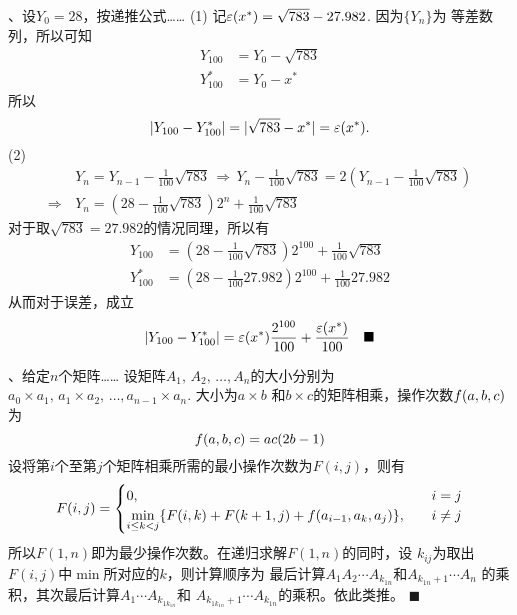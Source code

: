 \par{}、设$Y_0 = 28$，按递推公式……
\ans
  (1) 记$\varepsilon(x^*) = \sqrt{783} - 27.982$. 因为$\{Y_n\}$为
  等差数列，所以可知
  \[\begin{split}
    Y_{100} &= Y_0 - \sqrt{783} \\
    Y_{100}^* &= Y_0 - x^*
  \end{split}\]
  所以
  \[
    |Y_{100} - Y_{100}^*| = |\sqrt{783} - x^*| = \varepsilon(x^*).
  \]
  (2)
  \[\begin{split}
    &Y_n = Y_{n-1}-\frac{1}{100}\sqrt{783}
    \,\Rightarrow\,
    Y_n - \frac{1}{100}\sqrt{783} = 2\left(Y_{n-1} - \frac{1}{100}\sqrt{783}\right)\\
    \Rightarrow\, &
    Y_n = \left(28 - \frac{1}{100}\sqrt{783}\right)2^n
    + \frac{1}{100}\sqrt{783}
  \end{split}\]
  对于取$\sqrt{783} = 27.982$的情况同理，所以有
  \[\begin{split}
    Y_{100} &= \left(28 - \frac{1}{100}\sqrt{783}\right)2^{100}
    + \frac{1}{100}\sqrt{783} \\
    Y_{100}^* &= \left(28 - \frac{1}{100}27.982\right)2^{100}
    + \frac{1}{100}27.982
  \end{split}\]
  从而对于误差，成立
  \[
    |Y_{100}-Y_{100}^*| =
    \varepsilon(x^*)\frac{2^{100}}{100} + \frac{\varepsilon(x^*)}{100}
    \quad\blacksquare
  \]

\par{}、给定$n$个矩阵……
\ans
  设矩阵$A_1,\,A_2,\,\dots,A_n$的大小分别为$a_0\times a_1,\,
  a_1\times a_2,\,\dots,a_{n-1}\times a_n.$ 大小为$a\times b$
  和$b\times c$的矩阵相乘，操作次数$\mathnormal{f}(a, b, c)$为
  \[
    \mathnormal{f}(a, b, c) = ac(2b-1)
  \]
  设将第$i$个至第$j$个矩阵相乘所需的最小操作次数为$F(i, j)$，则有
  \[
    F(i, j) =
    \begin{cases}
      0,\quad & i = j \\
      \min\limits_{i \le k < j}
      \{ F(i, k) + F(k+1, j) + \mathnormal{f}(a_{i-1}, a_k, a_j) \},
      \quad & i \ne j
    \end{cases}
  \]
  所以$F(1,n)$即为最少操作次数。在递归求解$F(1,n)$的同时，设
  $k_{ij}$为取出$F(i, j)$中$\min$所对应的$k$，则计算顺序为
  最后计算$A_1A_2\cdots A_{k_{1n}}$和$A_{k_{1n}+1}\cdots A_n$
  的乘积，其次最后计算$A_1\cdots A_{k_{1k_{1n}}}$和
  $A_{k_{1k_{1n}}+1}\cdots A_{k_{1n}}$的乘积。依此类推。
  $\blacksquare$


